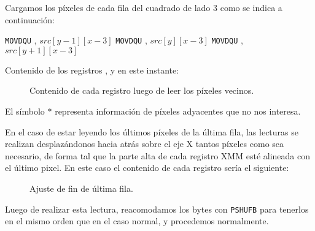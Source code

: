 Cargamos los píxeles de cada fila del cuadrado de lado 3 como se indica a continuación:

\begin{pseudocodigo}
    \STATE \texttt{MOVDQU} , $src[y-1][x-3]$
    \STATE \texttt{MOVDQU} , $src[y][x-3]$
    \STATE \texttt{MOVDQU} , $src[y+1][x-3]$        
\end{pseudocodigo}

Contenido de los registros ,  y  en este instante:

\begin{figure}[H]
    \centering
    \caption{Contenido de cada registro luego de leer los píxeles vecinos.}
\end{figure}

El símbolo $\ast$ representa información de píxeles adyacentes que no nos interesa.

En el caso de estar leyendo los últimos píxeles de la última fila, las lecturas
se realizan desplazándonos hacia atrás sobre el eje X tantos píxeles como sea
necesario, de forma tal que la parte alta de cada registro XMM esté alineada
con el último pixel. En este caso el contenido de cada registro sería
el siguiente:

\begin{figure}[H]
    \centering
    \caption{Ajuste de fin de última fila.}
\end{figure}

Luego de realizar esta lectura, reacomodamos los bytes con \texttt{PSHUFB}
para tenerlos en el mismo orden que en el caso normal, y procedemos normalmente.



